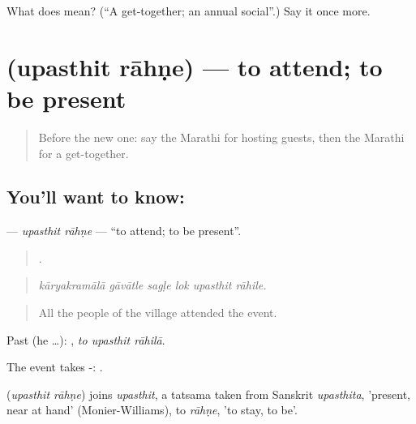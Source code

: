 \begin{tcolorbox}[breakable,colback=teal!4,colframe=teal!35!black,title={Before you move on}]
What does  mean? (\textquotedblleft{}A get-together; an annual social\textquotedblright{}.) Say it once more.
\end{tcolorbox}
\section[\texorpdfstring{\mr{उपस्थित} \mr{राहणे} (upasthit rāhṇe)}{उपस्थित राहणे (upasthit rāhṇe)}]{  (upasthit rāhṇe) — to attend; to be present}

\label{lesson:MR-C321-upasthit-rahne}



\begin{quote}
Before the new one: say the Marathi for hosting guests, then the Marathi for a get-together.
\end{quote}

\subsection*{You'll want to know:  }
\textbf{ } — \emph{upasthit rāhṇe} — \textquotedblleft{}to attend; to be present\textquotedblright{}.

\begin{quote}
     .
\end{quote}

\begin{quote}
\emph{kāryakramālā gāvātle sagḷe lok upasthit rāhile.}
\end{quote}

\begin{quote}
All the people of the village attended the event.
\end{quote}

Past (he …):   , \emph{to upasthit rāhilā}.

The event takes -:   .

\begin{cousinweb}
\textbf{ } (\emph{upasthit rāhṇe}) joins \emph{upasthit}, a tatsama taken from Sanskrit \emph{upasthita}, 'present, near at hand' (Monier-Williams), to \emph{rāhṇe}, 'to stay, to be'.
\end{cousinweb}


